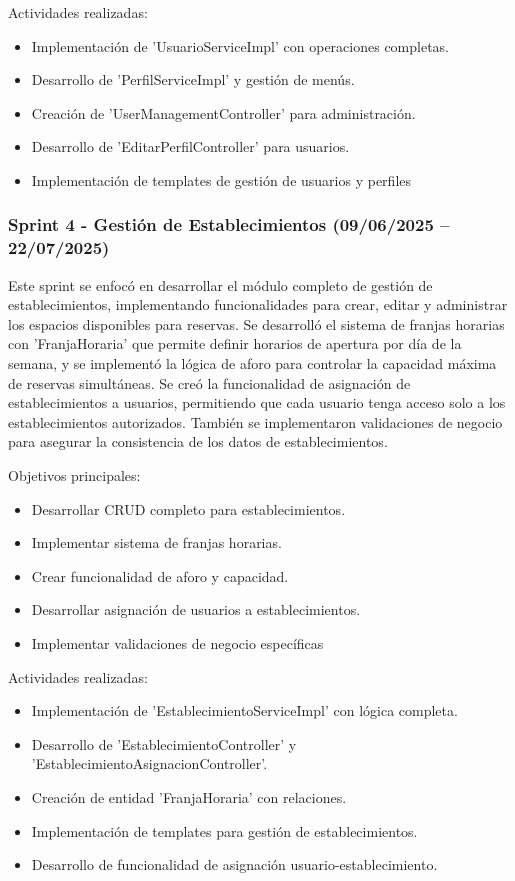 Actividades realizadas:
\begin{itemize}
\tightlist
\item
Implementación de 'UsuarioServiceImpl' con operaciones completas.
\item
Desarrollo de 'PerfilServiceImpl' y gestión de menús.
\item
Creación de 'UserManagementController' para administración.
\item
Desarrollo de 'EditarPerfilController' para usuarios.
\item
Implementación de templates de gestión de usuarios y perfiles
\end{itemize}

\subsubsection{Sprint 4 - Gestión de Establecimientos (09/06/2025 – 22/07/2025)} 
Este sprint se enfocó en desarrollar el módulo completo de gestión de establecimientos, implementando funcionalidades para crear, editar y administrar los espacios disponibles para reservas. Se desarrolló el sistema de franjas horarias con 'FranjaHoraria' que permite definir horarios de apertura por día de la semana, y se implementó la lógica de aforo para controlar la capacidad máxima de reservas simultáneas. Se creó la funcionalidad de asignación de establecimientos a usuarios, permitiendo que cada usuario tenga acceso solo a los establecimientos autorizados. También se implementaron validaciones de negocio para asegurar la consistencia de los datos de establecimientos.

Objetivos principales:
\begin{itemize}
\tightlist
\item
Desarrollar CRUD completo para establecimientos.
\item
Implementar sistema de franjas horarias.
\item
Crear funcionalidad de aforo y capacidad.
\item
Desarrollar asignación de usuarios a establecimientos.
\item
Implementar validaciones de negocio específicas
\end{itemize}

Actividades realizadas:
\begin{itemize}
\tightlist
\item
Implementación de 'EstablecimientoServiceImpl' con lógica completa.
\item
Desarrollo de 'EstablecimientoController' y 'EstablecimientoAsignacionController'.
\item
Creación de entidad 'FranjaHoraria' con relaciones.
\item
Implementación de templates para gestión de establecimientos.
\item
Desarrollo de funcionalidad de asignación usuario-establecimiento.
\end{itemize}







